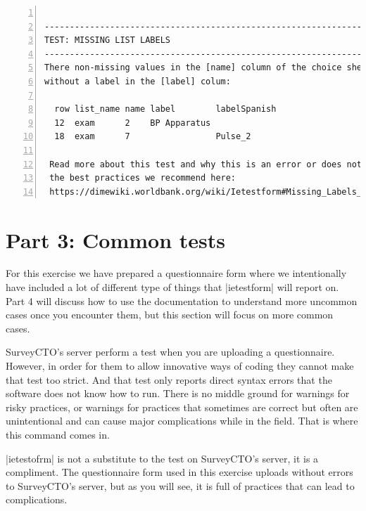\documentclass{tufte-handout}
\begin{document}
	\begin{minipage}{1.5\textwidth}
	 	\vspace{.5cm}
	 	\begin{Verbatim}[frame=lines,
	 					numbers=left,
	 					label=ietestform-test-section-example,
	 					samepage=true,
	 					baselinestretch=0.75]
	 	
----------------------------------------------------------------------
TEST: MISSING LIST LABELS
----------------------------------------------------------------------
There non-missing values in the [name] column of the choice sheet 
without a label in the [label] colum:
 
  row list_name name label        labelSpanish 
  12  exam      2    BP Apparatus 
  18  exam      7                 Pulse_2
 
 Read more about this test and why this is an error or does not follow 
 the best practices we recommend here:
 https://dimewiki.worldbank.org/wiki/Ietestform#Missing_Labels_or_Value.2FName_in_Choice_Lists

		\end{Verbatim}
		\vspace{.3cm}
	\end{minipage}

\section{Part 3: Common tests}

	For this exercise we have prepared a questionnaire form where we intentionally have included a lot of different type of things that |ietestform| will report on. Part 4 will discuss how to use the documentation to understand more uncommon cases once you encounter them, but this section will focus on more common cases.
	
	SurveyCTO's server perform a test when you are uploading a questionnaire. However, in order for them to allow innovative ways of coding they cannot make that test too strict. And that test only reports direct syntax errors that the software does not know how to run. There is no middle ground for warnings for risky practices, or warnings for practices that sometimes are correct but often are unintentional and can cause major complications while in the field. That is where this command comes in. 
	
	|ietestofrm| is not a substitute to the test on SurveyCTO's server, it is a compliment. The questionnaire form used in this exercise uploads without errors to SurveyCTO's server, but as you will see, it is full of practices that can lead to complications.
\end{document}
